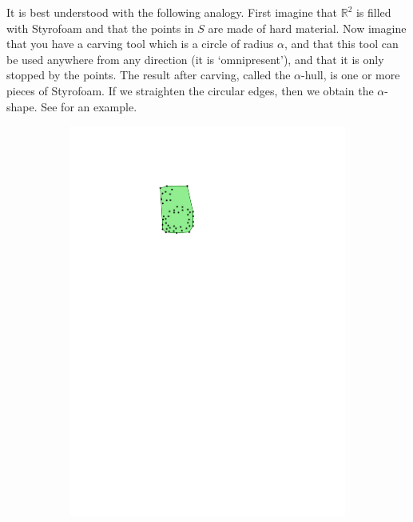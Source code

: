 It is best understood with the following analogy.
First imagine that $\mathbb{R}^2$ is filled with Styrofoam and that the points in $S$ are made of hard material.
Now imagine that you have a carving tool which is a circle of radius $\alpha$, and that this tool can be used anywhere from any direction (it is `omnipresent'), and that it is only stopped by the points.
The result after carving, called the $\alpha$-hull, is one or more pieces of Styrofoam.
If we straighten the circular edges, then we obtain the $\alpha$-shape.
See  for an example.
\begin{figure}
  \centering
  \begin{subfigure}[b]{0.15\linewidth}
    \centering
    \includegraphics[page=1,width=\textwidth]{figs/alphashape.pdf}
  \end{subfigure}
  \qquad 
  \begin{subfigure}[b]{0.15\linewidth}

\end{subfigure}
\end{figure}
